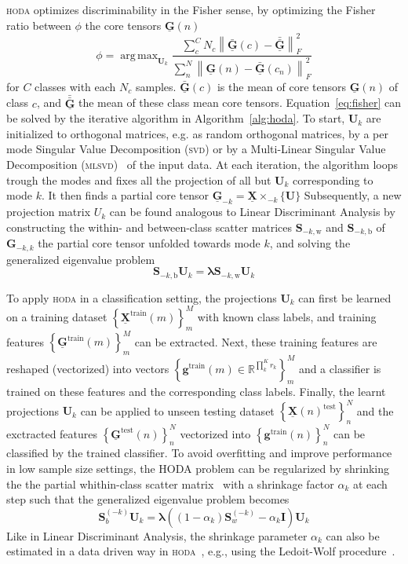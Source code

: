 \documentclass[twocolumn]{article}
\newcommand{\ten}[1]{\underline{\mathbf{#1}}} %
\newcommand{\mat}[1]{\mathbf{#1}} %
\renewcommand{\vec}[1]{\mathbf{#1}} %
\newcommand{\mmprs}[2]{\times_{-#2}\{#1\}} %
\DeclareMathOperator*{\argmax}{arg\,max}
\begin{document}
\textsc{hoda} optimizes discriminability in the Fisher sense, by optimizing the
Fisher ratio between $\phi$ the core tensors $\ten{G}(n)$
\begin{equation}
	\phi = \argmax_{\mat{U}_k}
	\frac{\sum_c^CN_c\left\lVert\bar{\ten{G}}(c)-\bar{\bar{\ten{G}}}\right\rVert_F^2}
	{\sum_n^N\left\lVert\ten{G}(n)-\bar{\ten{G}}(c_n)\right\rVert_F^2}
	\label{eq:fisher}
\end{equation}
for $C$ classes with each $N_c$ samples. $\bar{\ten{G}}(c)$ is the mean of core
tensors $\ten{G}(n)$ of class $c$, and $\bar{\bar{\ten{G}}}$ the mean of
these class mean core tensors.
Equation~\ref{eq:fisher} can be solved by the iterative algorithm in
Algorithm~\ref{alg:hoda}.
To start, $\mat{U}_k$ are initialized to orthogonal matrices, e.g. as random
orthogonal matrices, by a per mode Singular Value Decomposition (\textsc{svd})
or by a Multi-Linear Singular Value Decomposition (\textsc{mlsvd})~\cite{Lathauwer2000} of the input data.
At each iteration, the algorithm loops trough the modes and fixes all the
projection of all but $\mat{U}_k$ corresponding to mode $k$.
It then finds a partial core tensor $\ten{G}_{-k}=\ten{X}\mmprs{\mat{U}}{k}$
Subsequently, a new projection matrix $U_k$ can be found analogous to Linear
Discriminant Analysis by constructing the within- and between-class scatter
matrices $\mat{S}_{-k,\text{w}}$ and $\mat{S}_{-k,\text{b}}$ of
$\mat{G}_{-k,k}$ the partial core tensor unfolded towards mode $k$, and solving
the generalized eigenvalue problem
\begin{equation}
  \mat{S}_{-k,\text{b}}\mat{U}_k = \mat{\lambda}\mat{S}_{-k,\text{w}}\mat{U}_k
\end{equation}

To apply \textsc{hoda} in a classification setting, the projections $\mat{U}_k$
can first be learned on a training dataset
$\left\{\ten{X}^\text{train}(m)\right\}_m^M$ with known class labels, and
training features $\left\{\ten{G}^\text{train}(m)\right\}_m^M$ can be extracted.
Next, these training features are reshaped (vectorized) into vectors
$\left\{\vec{g}^\text{train}(m) \in \mathbb{R}^{\prod_k^Kr_k}\right\}_m^M$ and a classifier is
trained on these features and the corresponding class labels.
Finally, the learnt projections $\mat{U}_k$ can be applied to unseen testing
dataset $\left\{\ten{X}(n)^\text{test}\right\}_n^N$ and the exctracted features
$\left\{\ten{G}^\text{test}(n)\right\}_n^N$ vectorized into
$\left\{\vec{g}^\text{train}(n)\right\}_n^N$ can be
classified by the trained classifier.
To avoid overfitting and improve performance in low sample size settings, the
\textsc{HODA} problem can be regularized by shrinking the the partial
whithin-class scatter matrix~\cite{Phan2010} with a shrinkage factor
$\alpha_k$ at each step such that the generalized eigenvalue problem becomes
\begin{equation}
	\mat{S}_b^{(-k)}\mat{U}_k =
	\mat{\lambda}((1-\alpha_k)\mat{S}_w^{(-k)}-\alpha_k\mat{I})\mat{U}_k
\end{equation}
Like in Linear Discriminant Analysis, the shrinkage parameter $\alpha_k$ can
also be estimated in a data driven way in \textsc{hoda}~\cite{Jorajuria2022},
e.g., using the Ledoit-Wolf procedure~\cite{Ledoit2003}.
\end{document}
